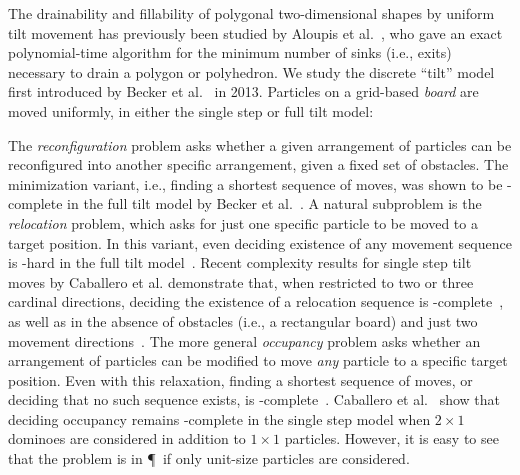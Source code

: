 \documentclass[a4paper,UKenglish,cleveref,thm-restate]{lipics-v2021}
\begin{document}
The drainability and fillability of polygonal two-dimensional shapes by uniform tilt movement has previously been studied by Aloupis et al.~\cite{acchlo-draining2014}, who gave an exact polynomial-time algorithm for the minimum number of sinks (i.e., exits) necessary to drain a polygon or polyhedron.
We study the discrete ``tilt'' model first introduced by Becker et al.~\cite{bhwrm-massive2013,caglsw-twodirections2023} in 2013.
Particles on a grid-based \emph{board} are moved uniformly, in either the single step or full tilt model:

The \emph{reconfiguration} problem asks whether a given arrangement of particles can be reconfigured into another specific arrangement, given a fixed set of obstacles.
The minimization variant, i.e., finding a shortest sequence of moves, was shown to be \PSPACE-complete in the full tilt model by Becker et al.~\cite{bdflmw-particle2019,6907856}.
A natural subproblem is the \emph{relocation} problem, which asks for just one specific particle to be moved to a target position.
In this variant, even deciding existence of any movement sequence is \NP-hard in the full tilt model~\cite{bdfhm-reconfiguring2013,bdflmw-particle2019}.
Recent complexity results for single step tilt moves by Caballero et al. demonstrate that, when restricted to two or three cardinal directions, deciding the existence of a relocation sequence is \NP-complete~\cite{ccglsw-hardness2020}, as well as in the absence of obstacles (i.e., a rectangular board) and just two movement directions~\cite{caglsw-twodirections2023}.
The more general \emph{occupancy} problem asks whether an arrangement of particles can be modified to move \emph{any} particle to a specific target position.
Even with this relaxation, finding a shortest sequence of moves, or deciding that no such sequence exists, is \PSPACE-complete~\cite{hierarchical2020,bdflmw-particle2019}.
Caballero et al.~\cite{caballero-cccg20-hardness} show that deciding occupancy remains \PSPACE-complete in the single step model when $2 \times 1$ dominoes are considered in addition to $1 \times 1$ particles.
However, it is easy to see that the problem is in \P\ if only unit-size particles are considered.
\end{document}
